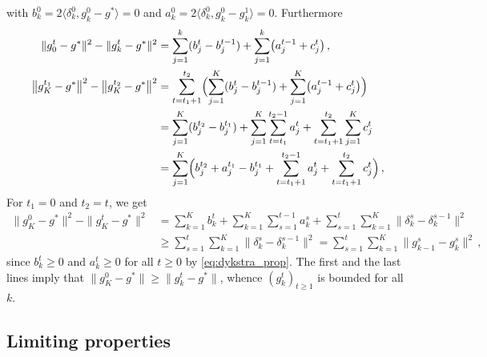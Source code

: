 \documentclass[a4paper]{article}
\begin{document}
with $b^0_k = 2 \langle \delta^0_k, g^0_k - g^* \rangle = 0$ and $a^0_k = 2 \langle
\delta^0_k, g^0_k - g^1_k\rangle = 0$. Furthermore
\begin{align}
  \|g^t_0 - g^*\|^2 - \|g^t_k - g^*\|^2
    &= \sum_{j=1}^k (b^t_j - b^{t-1}_j)
      + \sum_{j=1}^k \bigl( a^{t-1}_j + c^t_j \bigr)
    \,, \label{eq:t0k_norm} \\
  \bigl \| g^{t_1}_K - g^* \bigr \|^2 - \bigl \| g^{t_2}_K - g^* \bigr \|^2
    &= \sum_{t=t_1+1}^{t_2} \Bigl(
        \sum_{j=1}^K (b^t_j - b^{t-1}_j)
          + \sum_{j=1}^K \bigl( a^{t-1}_j + c^t_j \bigr)
        \Bigr)
      \notag \\
    &= \sum_{j=1}^K (b^{t_2}_j - b^{t_1}_j)
        + \sum_{j=1}^K \sum_{t=t_1}^{t_2-1} a^t_j
        + \sum_{t=t_1+1}^{t_2} \sum_{j=1}^K c^t_j
      \notag \\
    &= \sum_{j=1}^K \Bigl( b^{t_2}_j + a^{t_1}_j - b^{t_1}_j
          + \sum_{t=t_1+1}^{t_2-1} a^t_j + \sum_{t=t_1+1}^{t_2} c^t_j
      \Bigr)
    \,, \label{eq:t1t2K_norm}
\end{align}
For $t_1 = 0$ and $t_2 = t$, we get
\begin{align*}
  \|g^0_K - g^*\|^2 - \|g^t_K - g^*\|^2
    &= \sum_{k=1}^K b^t_k
        + \sum_{k=1}^K \sum_{s=1}^{t-1} a^s_k
        + \sum_{s=1}^t \sum_{k=1}^K \| \delta^s_k - \delta^{s-1}_k \|^2
      \\
    &\geq
      \sum_{s=1}^t \sum_{k=1}^K \| \delta^s_k - \delta^{s-1}_k \|^2
    = \sum_{s=1}^t \sum_{k=1}^K \| g^s_{k-1} - g^s_k \|^2
    \,,
\end{align*}
since $b^t_k \geq 0$ and $a^t_k \geq 0$ for all $t\geq 0$ by \eqref{eq:dykstra_prop}.
The first and the last lines imply that $\|g^0_K - g^*\| \geq \|g^t_k - g^*\|$, whence
$(g^t_k)_{t\geq1}$ is bounded for all $k$.


\subsection*{Limiting properties} %
\label{sub:limiting_properties}
\end{document}
